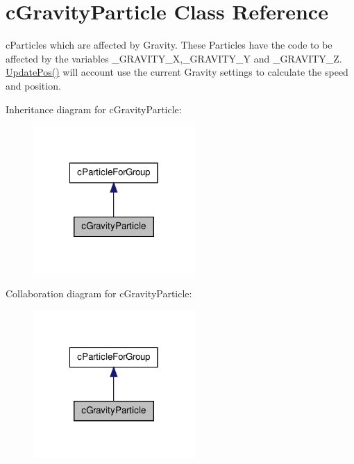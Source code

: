 \hypertarget{classc_gravity_particle}{
\section{cGravityParticle Class Reference}
\label{classc_gravity_particle}
}


cParticles which are affected by Gravity. These Particles have the code to be affected by the variables \_\-GRAVITY\_\-X,\_\-GRAVITY\_\-Y and \_\-GRAVITY\_\-Z. \hyperlink{classc_gravity_particle_a33c38fa25bb6a3767bd71f248646685b}{UpdatePos()} will account use the current Gravity settings to calculate the speed and position.  




Inheritance diagram for cGravityParticle:
\nopagebreak
\begin{figure}[H]
\begin{center}
\leavevmode
\includegraphics[width=174pt]{classc_gravity_particle__inherit__graph}
\end{center}
\end{figure}


Collaboration diagram for cGravityParticle:
\nopagebreak
\begin{figure}[H]
\begin{center}
\leavevmode
\includegraphics[width=174pt]{classc_gravity_particle__coll__graph}
\end{center}
\end{figure}
